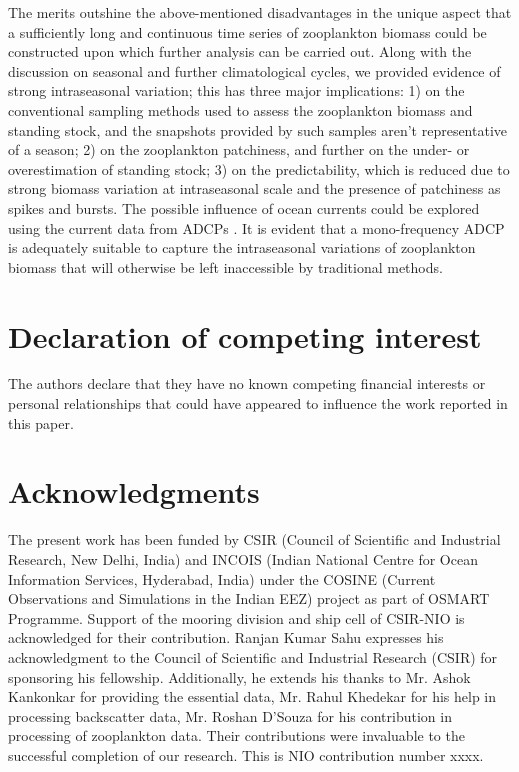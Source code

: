 \documentclass[authoryear,review,11pt]{elsarticle}
\begin{document}
The merits outshine the above-mentioned disadvantages in the unique aspect that a sufficiently long and continuous time series of zooplankton biomass could be constructed upon which further analysis can be carried out. Along with the discussion on seasonal and further climatological cycles, we provided evidence of strong intraseasonal variation; this has three major implications: 1) on the conventional sampling methods used to assess the zooplankton biomass and standing stock, and the snapshots provided by such samples aren't representative of a season; 2) on the zooplankton patchiness, and further on the under- or overestimation of standing stock; 3) on the predictability, which is reduced due to strong biomass variation at intraseasonal scale and the presence of patchiness as spikes and bursts. The possible influence of ocean currents could be explored using the current data from ADCPs \citep{hitchcock2002zooplankton,lawson2004acoustically}. It is evident that a mono-frequency ADCP is adequately suitable to capture the intraseasonal variations of zooplankton biomass that will otherwise be left inaccessible by traditional methods.

\section{Declaration of competing interest}
The authors declare that they have no known competing financial interests or personal
relationships that could have appeared to influence the work reported in this paper.

\section{Acknowledgments} 

The present work has been funded by CSIR (Council of Scientific and Industrial Research, New Delhi, India) and INCOIS (Indian National Centre for Ocean Information Services, Hyderabad, India)  under the COSINE (Current Observations and Simulations in the Indian EEZ) project as part of OSMART Programme. Support of the mooring division and ship cell of CSIR-NIO is acknowledged for their contribution. Ranjan Kumar Sahu expresses his acknowledgment to the Council of Scientific and Industrial Research (CSIR) for sponsoring his fellowship. Additionally, he extends his thanks to Mr. Ashok Kankonkar for providing the essential data, Mr. Rahul Khedekar for his help in processing backscatter data, Mr. Roshan D'Souza for his contribution  in processing of zooplankton data. Their contributions were invaluable to the successful completion of our research. This is NIO contribution number xxxx.
\end{document}
